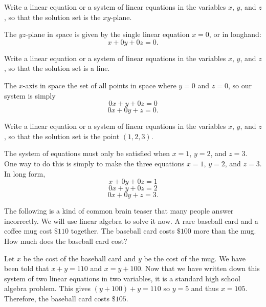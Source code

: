\begin{problems}
\problem Write a linear equation or a system of linear equations in
  the variables $x$, $y$, and $z$, so that the solution set is 
  the $xy$-plane. \newline
  \begin{solution}
      The $yz$-plane in space is given by the single linear equation 
      $x=0$, or in longhand: %
      \[x + 0y + 0z = 0.\] 
  \end{solution}

\problem Write a linear equation or a system of linear equations in
  the variables $x$, $y$, and $z$, so that the solution set is 
  a line. \newline
  \begin{solution}
      The $x$-axis in space the set of all points in space
      where $y=0$ and $z=0$, so our system is simply
      \[0x + y + 0z =0 \]
      \[0x + 0y + z = 0.\]
  \end{solution}

\problem Write a linear equation or a system of linear equations in
  the variables $x$, $y$, and $z$, so that the solution set is the 
  point $(1, 2, 3)$. \newline
  \begin{solution}
      The system of equations must only be satisfied when
      $x=1$, $y=2$, and $z=3$.  One way to do this is simply to make
      the three equations $x=1$, $y=2$, and $z=3$.  In long form,
      \[x + 0y + 0z = 1\]
      \[0x + y + 0z = 2\]
      \[0x + 0y + z = 3.\]      
  \end{solution}

\problem %
The following is a kind of common brain teaser that many people answer
incorrectly.  We will use linear algebra to solve it now. \newline
\newline A rare baseball card and a coffee mug cost $\$110$ together.
The baseball card costs $\$100$ more than the mug.  How much does the
baseball card cost?

\begin{solution}
  Let $x$ be the cost of the baseball card and $y$ be the cost of the
  mug.  We have been told that $x + y = 110$ and $x = y + 100$.  Now
  that we have written down this system of two linear equations in two
  variables, it is a standard high school algebra problem.  This gives
  $(y+100)+y= 110$ so $y=5$ and thus $x=105$.  Therefore, the baseball
  card costs $\$105$.
\end{solution}


\end{problems}
